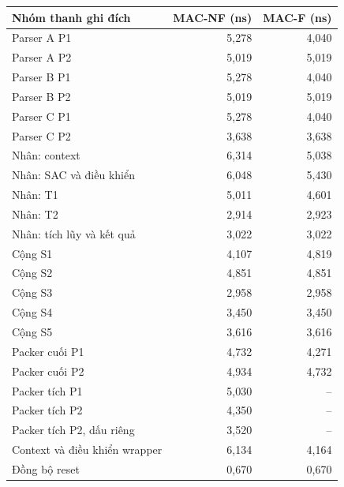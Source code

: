 \begin{inlinetable}
  \centering
  \small
  \caption{Độ trễ F2F D/CE lớn nhất theo từng nhóm thanh ghi đích sau tổng hợp OOC cơ sở giữa MAC-NF và MAC-F (giữ động hai cổng cấu hình).}
  \label{tab:f2f-stages}
  \begin{tabular}{lrr}
    \hline
    Nhóm thanh ghi đích & MAC-NF (ns) & MAC-F (ns) \\
    \hline
    Parser A P1 & 5,278 & 4,040 \\
    Parser A P2 & 5,019 & 5,019 \\
    Parser B P1 & 5,278 & 4,040 \\
    Parser B P2 & 5,019 & 5,019 \\
    Parser C P1 & 5,278 & 4,040 \\
    Parser C P2 & 3,638 & 3,638 \\
    Nhân: context & 6,314 & 5,038 \\
    Nhân: SAC và điều khiển & 6,048 & 5,430 \\
    Nhân: T1 & 5,011 & 4,601 \\
    Nhân: T2 & 2,914 & 2,923 \\
    Nhân: tích lũy và kết quả & 3,022 & 3,022 \\
    Cộng S1 & 4,107 & 4,819 \\
    Cộng S2 & 4,851 & 4,851 \\
    Cộng S3 & 2,958 & 2,958 \\
    Cộng S4 & 3,450 & 3,450 \\
    Cộng S5 & 3,616 & 3,616 \\
    Packer cuối P1 & 4,732 & 4,271 \\
    Packer cuối P2 & 4,934 & 4,732 \\
    Packer tích P1 & 5,030 & -- \\
    Packer tích P2 & 4,350 & -- \\
    Packer tích P2, dấu riêng & 3,520 & -- \\
    Context và điều khiển wrapper & 6,134 & 4,164 \\
    Đồng bộ reset & 0,670 & 0,670 \\
    \hline
  \end{tabular}
\end{inlinetable}
